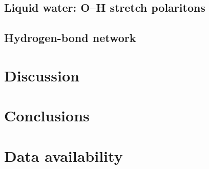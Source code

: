 \documentclass[aps,prb,reprint,superscriptaddress,nofootinbib,floatfix]{revtex4-2}
\begin{document}
\subsection{Liquid water: O--H stretch polaritons}
\label{sec:liquid}

\subsection{Hydrogen-bond network}
\label{sec:hbond}

\section{Discussion}

\section{Conclusions}

\begin{acknowledgments}
\end{acknowledgments}

\section*{Data availability}
\end{document}
